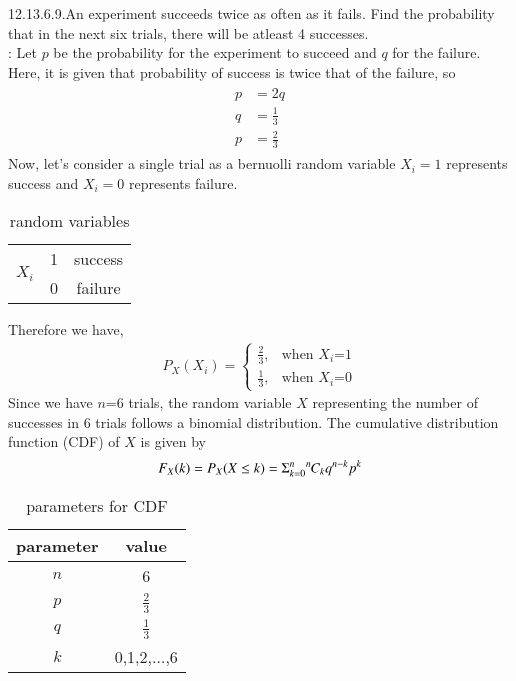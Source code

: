 \documentclass[journal,12pt,twocolumn]{IEEEtran}
\begin{document}
\renewcommand{\thefigure}{\theenumi}
\renewcommand{\thetable}{\theenumi}
12.13.6.9.An experiment succeeds twice as often as it fails. Find the probability that in the next six trials, there will be atleast 4 successes.
\\ \solution:
\fi
Let $p$ be the probability for the experiment to succeed and $q$ for the failure.\\
Here, it is given that probability of success is twice that of the failure, so 
\begin{align}
\begin{split}
p&=2q\\
q&= \frac{1}{3}\\
p&= \frac{2}{3}
\end{split}
\end{align}
Now, let's consider a single trial as a bernuolli random variable $X_{i}=1$ represents success and $X_{i}=0$ represents failure.
\begin{table}[h]
\centering
\caption{random variables}
\label{table.1:12.13.6.9}
\begin{tabular}{|c|c|c|}
\hline
\multirow{2}{*}{$X_i$}& 1 & success\\
\cline{2-2} \cline{3-3}
& 0 & failure\\
\hline
\end{tabular}
\end{table}
Therefore we have,
\begin{align}
           P_X(X_i)=
           \begin{cases}
           \frac{2}{3}, & \text{when $X_i$=1}\\
           \frac{1}{3}, & \text{when $X_i$=0}
           \end{cases}
\end{align}
Since we have $n$=6 trials, the random variable $X$ representing the number of successes in 6 trials follows a binomial distribution. The cumulative distribution function (CDF) of $X$ is given by
\begin{equation}
\label{eq:bd}
F_X(k)= P_X(X \le k)= \Sigma_{k=0}^n\comb{n}{k}q^{n-k}p^{k}
\end{equation}
\begin{table}[h]
\centering
\caption{parameters for CDF}
\label{table.2:12.13.6.9}
\begin{tabular}{|c|c|}
\hline
parameter & value\\
\hline
$n$ & 6\\
\hline
$p$ & $\frac{2}{3}$\\
\hline
$q$ & $\frac{1}{3}$\\
\hline
$k$ & 0,1,2,$\ldots$,6\\
\hline
\end{tabular}
\end{table}
\end{document}

